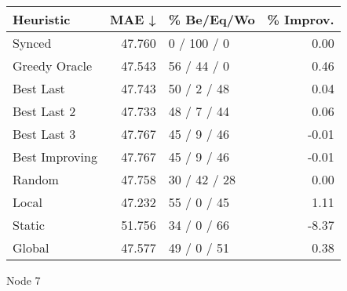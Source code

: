 \begin{tabular}{lrlr}
\toprule
\textbf{Heuristic} & \textbf{MAE ↓} & \textbf{\% Be/Eq/Wo} & \textbf{\% Improv.} \\
\midrule
            Synced &         47.760 &          0 / 100 / 0 &                0.00 \\
     Greedy Oracle &         47.543 &          56 / 44 / 0 &                0.46 \\
         Best Last &         47.743 &          50 / 2 / 48 &                0.04 \\
       Best Last 2 &         47.733 &          48 / 7 / 44 &                0.06 \\
       Best Last 3 &         47.767 &          45 / 9 / 46 &               -0.01 \\
    Best Improving &         47.767 &          45 / 9 / 46 &               -0.01 \\
            Random &         47.758 &         30 / 42 / 28 &                0.00 \\
             Local &         47.232 &          55 / 0 / 45 &                1.11 \\
            Static &         51.756 &          34 / 0 / 66 &               -8.37 \\
            Global &         47.577 &          49 / 0 / 51 &                0.38 \\
\bottomrule
\end{tabular}
\caption{Node 7}
\label{tab:iid_lr01_le1_bs2_7}
